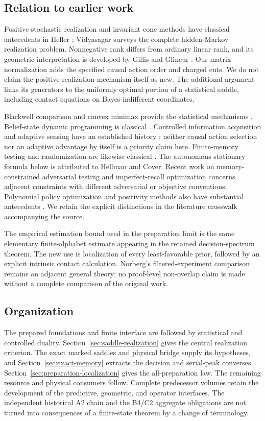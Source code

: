 \subsection{Relation to earlier work}
Positive stochastic realization and invariant cone methods have classical
antecedents in Heller \cite{Heller}; Vidyasagar \cite{Vidyasagar} surveys
the complete hidden-Markov realization problem. Nonnegative rank differs
from ordinary linear rank, and its geometric interpretation is developed
by Gillis and Glineur \cite{GG}. Our matrix normalization adds the
specified causal action order and charged cuts. We do not claim the
positive-realization mechanism itself as new. The additional argument
links its generators to the uniformly optimal portion of a statistical
saddle, including contact equations on Bayes-indifferent coordinates.

Blackwell comparison and convex minimax provide the statistical
mechanisms \cite{Blackwell,Sion}. Belief-state dynamic programming is
classical \cite{SmallwoodSondik}. Controlled information acquisition and
adaptive sensing have an established history
\cite{Chernoff,NJ,NAV}; neither causal action selection nor an adaptive
advantage by itself is a priority claim here. Finite-memory testing and
randomization are likewise classical \cite{HC,HCrandom,FH,CFH}. The
autonomous stationary formula below is attributed to Hellman and Cover.
Recent work on memory-constrained adversarial testing \cite{MP} and
imperfect-recall optimization \cite{ZSV} concerns adjacent constraints
with different adversarial or objective conventions. Polynomial policy
optimization and positivity methods also have substantial antecedents
\cite{MM,Putinar}. We retain the explicit distinctions in the literature
crosswalk accompanying the source.

The empirical estimation bound used in the preparation limit is the
same elementary finite-alphabet estimate appearing in the retained
decision-spectrum theorem. The new use is localization of every
least-favorable prior, followed by an explicit intrinsic contact
calculation. Norberg's filtered-experiment comparison \cite{Norberg}
remains an adjacent general theory; no proof-level non-overlap claim is
made without a complete comparison of the original work.

\subsection{Organization}
The prepared foundations and finite interface are followed by statistical
and controlled duality. Section~\ref{sec:saddle-realization} gives the
central realization criterion. The exact marked saddles and physical
bridge supply its hypotheses, and Section~\ref{sec:exact-memory}
extracts the decision and serial-peak converses. Section~\ref{sec:preparation-localization}
gives the all-preparation law. The remaining resource and physical
consumers follow. Complete predecessor volumes retain the development
of the predictive, geometric, and operator interfaces. The independent
historical A2 chain and the B4/C2 aggregate obligations are not turned
into consequences of a finite-state theorem by a change of terminology.
